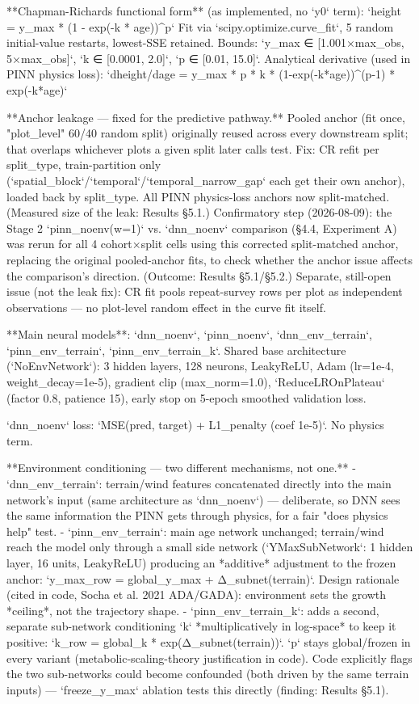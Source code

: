 \documentclass[11pt,a4paper]{report}
\begin{document}
**Chapman-Richards functional form** (as implemented, no `y0` term):
`height = y_max * (1 - exp(-k * age))^p`
Fit via `scipy.optimize.curve_fit`, 5 random initial-value restarts, lowest-SSE retained. Bounds: `y_max ∈ [1.001×max_obs, 5×max_obs]`, `k ∈ [0.0001, 2.0]`, `p ∈ [0.01, 15.0]`.
Analytical derivative (used in PINN physics loss):
`dheight/dage = y_max * p * k * (1-exp(-k*age))^(p-1) * exp(-k*age)`

**Anchor leakage — fixed for the predictive pathway.** Pooled anchor (fit once, "plot_level" 60/40 random split) originally reused across every downstream split; that overlaps whichever plots a given split later calls test. Fix: CR refit per split_type, train-partition only (`spatial_block`/`temporal`/`temporal_narrow_gap` each get their own anchor), loaded back by split_type. All PINN physics-loss anchors now split-matched. (Measured size of the leak: Results §5.1.)
Confirmatory step (2026-08-09): the Stage 2 `pinn_noenv(w=1)` vs. `dnn_noenv` comparison (§4.4, Experiment A) was rerun for all 4 cohort×split cells using this corrected split-matched anchor, replacing the original pooled-anchor fits, to check whether the anchor issue affects the comparison's direction. (Outcome: Results §5.1/§5.2.)
Separate, still-open issue (not the leak fix): CR fit pools repeat-survey rows per plot as independent observations — no plot-level random effect in the curve fit itself.

**Main neural models**: `dnn_noenv`, `pinn_noenv`, `dnn_env_terrain`, `pinn_env_terrain`, `pinn_env_terrain_k`.
Shared base architecture (`NoEnvNetwork`): 3 hidden layers, 128 neurons, LeakyReLU, Adam (lr=1e-4, weight_decay=1e-5), gradient clip (max_norm=1.0), `ReduceLROnPlateau` (factor 0.8, patience 15), early stop on 5-epoch smoothed validation loss.

`dnn_noenv` loss: `MSE(pred, target) + L1_penalty (coef 1e-5)`. No physics term.

**Environment conditioning — two different mechanisms, not one.**
- `dnn_env_terrain`: terrain/wind features concatenated directly into the main network's input (same architecture as `dnn_noenv`) — deliberate, so DNN sees the same information the PINN gets through physics, for a fair "does physics help" test.
- `pinn_env_terrain`: main age network unchanged; terrain/wind reach the model only through a small side network (`YMaxSubNetwork`: 1 hidden layer, 16 units, LeakyReLU) producing an *additive* adjustment to the frozen anchor: `y_max_row = global_y_max + Δ_subnet(terrain)`. Design rationale (cited in code, Socha et al. 2021 ADA/GADA): environment sets the growth *ceiling*, not the trajectory shape.
- `pinn_env_terrain_k`: adds a second, separate sub-network conditioning `k` *multiplicatively in log-space* to keep it positive: `k_row = global_k * exp(Δ_subnet(terrain))`. `p` stays global/frozen in every variant (metabolic-scaling-theory justification in code). Code explicitly flags the two sub-networks could become confounded (both driven by the same terrain inputs) — `freeze_y_max` ablation tests this directly (finding: Results §5.1).
\end{document}
